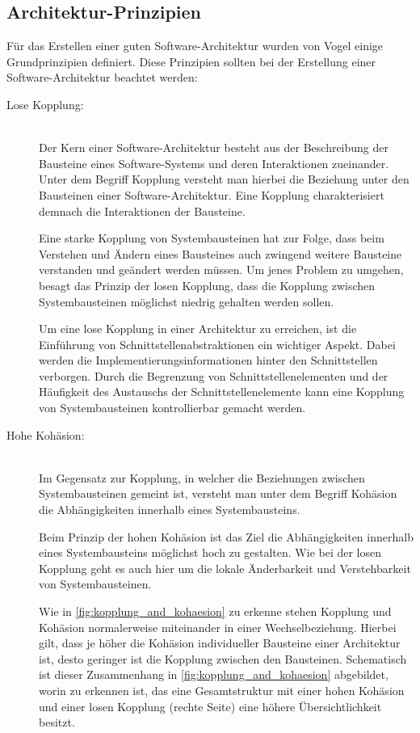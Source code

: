 \subsection{Architektur-Prinzipien\label{subsec2.1.1:Unterunterpunkt-1}}

Für das Erstellen einer guten Software-Architektur wurden von Vogel \cite{Vogel.2009} einige Grundprinzipien definiert. Diese Prinzipien sollten bei der Erstellung einer Software-Architektur beachtet werden: \cite{Vogel.2009}

\begin{description}
    \item[Lose Kopplung:]\hfill \\
    Der Kern einer Software-Architektur besteht aus der Beschreibung der Bausteine eines Software-Systems und deren Interaktionen zueinander. Unter dem Begriff Kopplung versteht man hierbei die Beziehung unter den Bausteinen einer Software-Architektur. Eine Kopplung charakterisiert demnach die Interaktionen der Bausteine.

    Eine starke Kopplung von Systembausteinen hat zur Folge, dass beim Verstehen und Ändern eines Bausteines auch zwingend weitere Bausteine verstanden und geändert werden müssen. Um jenes Problem zu umgehen, besagt das Prinzip der losen Kopplung, dass die Kopplung zwischen Systembausteinen möglichst niedrig gehalten werden sollen.

    Um eine lose Kopplung in einer Architektur zu erreichen, ist die Einführung von Schnittstellenabstraktionen ein wichtiger Aspekt. Dabei werden die Implementierungsinformationen hinter den Schnittstellen verborgen. Durch die Begrenzung von Schnittstellenelementen und der Häufigkeit des Austauschs der Schnittstellenelemente kann eine Kopplung von Systembausteinen kontrollierbar gemacht werden.

    \item[Hohe Kohäsion:]\hfill \\
    Im Gegensatz zur Kopplung, in welcher die Beziehungen zwischen Systembausteinen gemeint ist, versteht man unter dem Begriff Kohäsion die Abhängigkeiten innerhalb eines Systembausteins.

    Beim Prinzip der hohen Kohäsion ist das Ziel die Abhängigkeiten innerhalb eines Systembausteins möglichst hoch zu gestalten. Wie bei der losen Kopplung geht es auch hier um die lokale Änderbarkeit und Verstehbarkeit von Systembausteinen.
    
    Wie in \autoref{fig:kopplung_and_kohaesion} zu erkenne stehen Kopplung und Kohäsion normalerweise miteinander in einer Wechselbeziehung. Hierbei gilt, dass je höher die Kohäsion individueller Bausteine einer Architektur ist, desto geringer ist die Kopplung zwischen den Bausteinen. Schematisch ist dieser Zusammenhang in \autoref{fig:kopplung_and_kohaesion} abgebildet, worin zu erkennen ist, das eine Gesamtstruktur mit einer hohen Kohäsion und einer losen Kopplung (rechte Seite) eine höhere Übersichtlichkeit besitzt.


\end{description}
